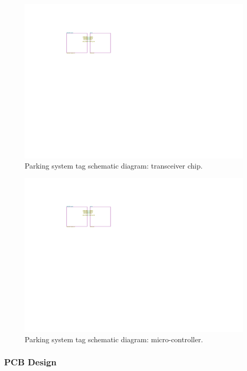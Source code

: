 \begin{figure}[H]
\begin{center}
\includegraphics[page=2,scale=0.5,trim={0cm 0cm 0cm 0cm},clip]{data/parking-system.pdf}
\caption{Parking system tag schematic diagram: transceiver chip.}
\end{center}
\end{figure}

\begin{figure}[H]
\begin{center}
\includegraphics[page=3,scale=1,trim={10cm 8cm 10cm 5cm},clip]{data/parking-system.pdf}
\caption{Parking system tag schematic diagram: micro-controller.}
\end{center}
\end{figure}

\subsubsection{PCB Design}

